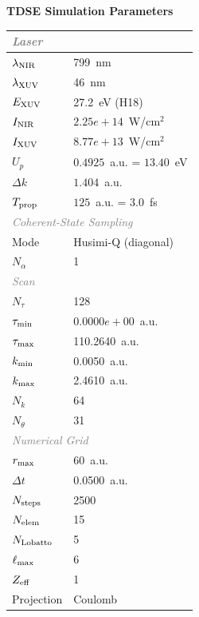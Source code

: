 \documentclass[11pt]{article}
\begin{document}

\begin{center}
  \Large\textbf{TDSE Simulation Parameters}
\end{center}
\vspace{4pt}

\begin{tabular}{@{}ll@{}}
  \toprule
  \multicolumn{2}{l}{\small\textit{\textcolor{gray}{Laser}}} \\
  \hline
  $\lambda_{\rm NIR}$ & 799~nm \\
  $\lambda_{\rm XUV}$ & 46~nm \\
  $E_{\rm XUV}$ & 27.2~eV (H18) \\
  $I_{\rm NIR}$ & $2.25e+14$~W/cm$^2$ \\
  $I_{\rm XUV}$ & $8.77e+13$~W/cm$^2$ \\
  $U_p$ & $0.4925$~a.u. = $13.40$~eV \\
  $\Delta k$ & $1.404$~a.u. \\
  $T_{\rm prop}$ & $125$~a.u. = $3.0$~fs \\
  \multicolumn{2}{l}{\small\textit{\textcolor{gray}{Coherent-State Sampling}}} \\
  \hline
  Mode & Husimi-Q (diagonal) \\
  $N_{\alpha}$ & 1 \\
  \multicolumn{2}{l}{\small\textit{\textcolor{gray}{Scan}}} \\
  \hline
  $N_{\tau}$ & 128 \\
  $\tau_{\rm min}$ & $0.0000e+00$~a.u. \\
  $\tau_{\rm max}$ & 110.2640~a.u. \\
  $k_{\rm min}$ & 0.0050~a.u. \\
  $k_{\rm max}$ & 2.4610~a.u. \\
  $N_k$ & 64 \\
  $N_{\theta}$ & 31 \\
  \multicolumn{2}{l}{\small\textit{\textcolor{gray}{Numerical Grid}}} \\
  \hline
  $r_{\rm max}$ & 60~a.u. \\
  $\Delta t$ & 0.0500~a.u. \\
  $N_{\rm steps}$ & 2500 \\
  $N_{\rm elem}$ & 15 \\
  $N_{\rm Lobatto}$ & 5 \\
  $\ell_{\rm max}$ & 6 \\
  $Z_{\rm eff}$ & 1 \\
  Projection & Coulomb \\
  \bottomrule
\end{tabular}
\end{document}
